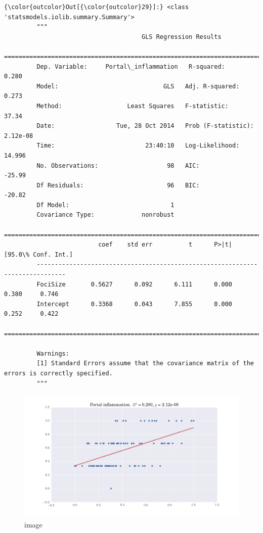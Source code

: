 \documentclass{article}
\begin{document}
            \begin{Verbatim}[commandchars=\\\{\}]
{\color{outcolor}Out[{\color{outcolor}29}]:} <class 'statsmodels.iolib.summary.Summary'>
         """
                                      GLS Regression Results                            
         ===============================================================================
         Dep. Variable:     Portal\_inflammation   R-squared:                       0.280
         Model:                             GLS   Adj. R-squared:                  0.273
         Method:                  Least Squares   F-statistic:                     37.34
         Date:                 Tue, 28 Oct 2014   Prob (F-statistic):           2.12e-08
         Time:                         23:40:10   Log-Likelihood:                 14.996
         No. Observations:                   98   AIC:                            -25.99
         Df Residuals:                       96   BIC:                            -20.82
         Df Model:                            1                                         
         Covariance Type:             nonrobust                                         
         ==============================================================================
                          coef    std err          t      P>|t|      [95.0\% Conf. Int.]
         ------------------------------------------------------------------------------
         FociSize       0.5627      0.092      6.111      0.000         0.380     0.746
         Intercept      0.3368      0.043      7.855      0.000         0.252     0.422
         ==============================================================================
         
         Warnings:
         [1] Standard Errors assume that the covariance matrix of the errors is correctly specified.
         """
\end{Verbatim}
        
    \begin{figure}[htbp]
\centering
\includegraphics{figures/portal_inflammation.png}
\caption{image}
\end{figure}
\end{document}

